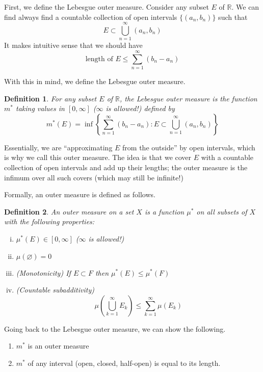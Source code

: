 \documentclass[10pt]{article}         %
\newtheorem{definition}{Definition}[section]
\theoremstyle{remark}
\newcommand{\R}{\mathbb{R}}
\begin{document}
First, we define the Lebesgue outer measure. Consider any subset $E$ of $\R$. We can find always find a countable collection of open intervals $\{ (a_n, b_n) \}$ such that 
\[
E \subset \bigcup_{n=1}^\infty (a_n, b_n)
\]
It makes intuitive sense that we should have
\[
\text{length of }E \leq \sum_{n = 1}^\infty (b_n - a_n)
\]

With this in mind, we define the Lebesgue outer measure.

\begin{definition}
For any subset $E$ of $\R$, the Lebesgue outer measure is the function $m^*$ taking values in $[0, \infty]$ ($\infty$ is allowed!) defined by
\[
m^*(E) = \inf\left\{ \sum_{n = 1}^\infty (b_n - a_n) : E \subset \bigcup_{n=1}^\infty (a_n, b_n) \right\}
\]
\end{definition}
Essentially, we are ``approximating $E$ from the outside'' by open intervals, which is why we call this outer measure. The idea is that we cover $E$ with a countable collection of open intervals and add up their lengths; the outer measure is the infimum over all such covers (which may still be infinite!)

Formally, an outer measure is defined as follows.

\begin{definition}An \emph{outer measure} on a set $X$ is a function $\mu^*$ on \emph{all} subsets of $X$ with the following properties:
\begin{enumerate}[(i)]
\item $\mu^*(E) \in [0, \infty]$ ($\infty$ is allowed!)
\item $\mu(\varnothing) = 0$
\item (Monotonicity) If $E \subset F$ then $\mu^*(E) \leq \mu^*(F)$
\item (Countable subadditivity)
	\begin{equation}
	\mu \left( \bigcup_{k=1}^\infty E_k \right) \leq \sum_{k=1}^\infty \mu(E_k)
	\end{equation}
\end{enumerate}
\end{definition}

Going back to the Lebesgue outer measure, we can show the following.
\begin{enumerate}
    \item $m^*$ is an outer measure
    \item $m^*$ of any interval (open, closed, half-open) is equal to its length.
\end{enumerate}
\end{document}
